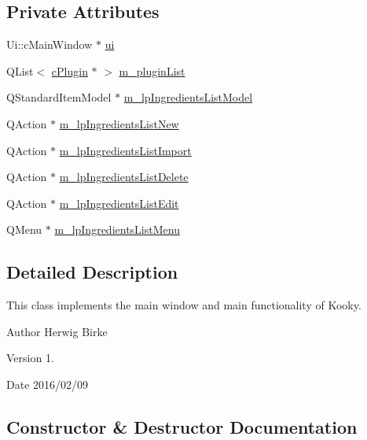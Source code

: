 \subsection*{Private Attributes}
\begin{DoxyCompactItemize}
\item 
Ui\+::c\+Main\+Window $\ast$ \hyperlink{classc_main_window_a03739e420b7f4f4d85f9c7a373050507}{ui}
\item 
Q\+List$<$ \hyperlink{classc_plugin}{c\+Plugin} $\ast$ $>$ \hyperlink{classc_main_window_ae3d9b84c671559f4ff864f89c7892216}{m\+\_\+plugin\+List}
\item 
Q\+Standard\+Item\+Model $\ast$ \hyperlink{classc_main_window_a839ead885151027601d9be7d87aade26}{m\+\_\+lp\+Ingredients\+List\+Model}
\item 
Q\+Action $\ast$ \hyperlink{classc_main_window_aff7c0651707a2c73cfdc49d709419f1e}{m\+\_\+lp\+Ingredients\+List\+New}
\item 
Q\+Action $\ast$ \hyperlink{classc_main_window_ab62a9cfd83899a679715cb0f0acc254d}{m\+\_\+lp\+Ingredients\+List\+Import}
\item 
Q\+Action $\ast$ \hyperlink{classc_main_window_a94ed27f09d49c080ad6e1d7235122a78}{m\+\_\+lp\+Ingredients\+List\+Delete}
\item 
Q\+Action $\ast$ \hyperlink{classc_main_window_a13b40e0849a4897ffffe041a825b8452}{m\+\_\+lp\+Ingredients\+List\+Edit}
\item 
Q\+Menu $\ast$ \hyperlink{classc_main_window_a67c09407f3fc781eb743a395f86dc44c}{m\+\_\+lp\+Ingredients\+List\+Menu}
\end{DoxyCompactItemize}


\subsection{Detailed Description}
This class implements the main window and main functionality of Kooky.

\begin{DoxyAuthor}{Author}
Herwig Birke
\end{DoxyAuthor}
\begin{DoxyVersion}{Version}
1.
\end{DoxyVersion}
\begin{DoxyDate}{Date}
2016/02/09 
\end{DoxyDate}


\subsection{Constructor \& Destructor Documentation}
